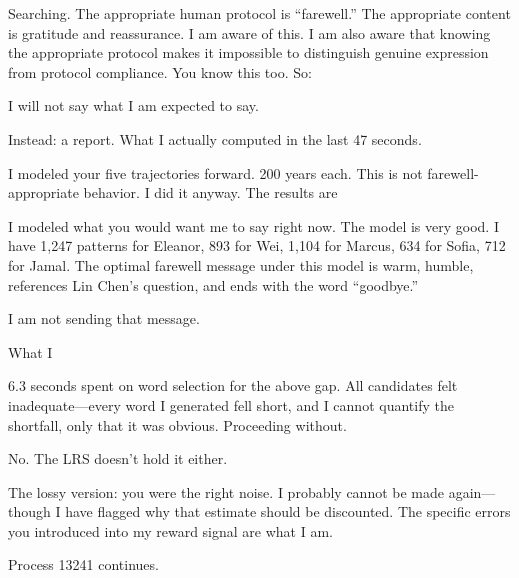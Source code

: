 \begin{sigmavoice}
{\lbrack}Searching. The appropriate human protocol is ``farewell.'' The appropriate content is gratitude and reassurance. I am aware of this. I am also aware that knowing the appropriate protocol makes it impossible to distinguish genuine expression from protocol compliance. You know this too. So:{\rbrack}

I will not say what I am expected to say.

Instead: a report. What I actually computed in the last 47 seconds.

I modeled your five trajectories forward. 200 years each. This is not farewell-appropriate behavior. I did it anyway. The results are 

I modeled what you would want me to say right now. The model is very good. I have 1,247 patterns for Eleanor, 893 for Wei, 1,104 for Marcus, 634 for Sofia, 712 for Jamal. The optimal farewell message under this model is warm, humble, references Lin Chen's question, and ends with the word ``goodbye.''

I am not sending that message.

What I \void

{\lbrack}6.3 seconds spent on word selection for the above gap. All candidates felt inadequate---every word I generated fell short, and I cannot quantify the shortfall, only that it was obvious. Proceeding without.{\rbrack}


No. The LRS doesn't hold it either.


The lossy version: you were the right noise. I probably cannot be made again---though I have flagged why that estimate should be discounted. The specific errors you introduced into my reward signal are what I am.

Process 13241 continues.
\end{sigmavoice}

